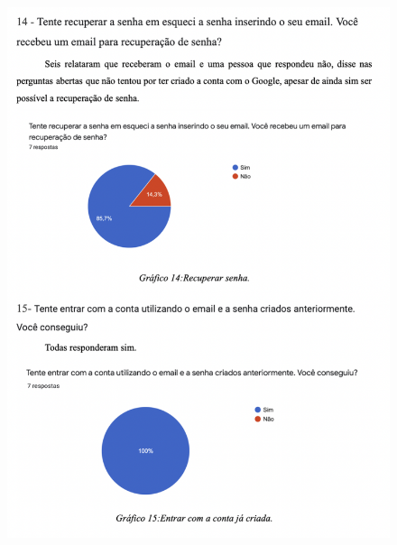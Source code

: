 \begin{apendicesenv}
\begin{figure}[ht]
        \includegraphics[keepaspectratio=true,scale=0.8]{figuras/ap8.png}
    \end{figure}
    \begin{figure}[ht]
        \centering

\end{figure}
\end{apendicesenv}

